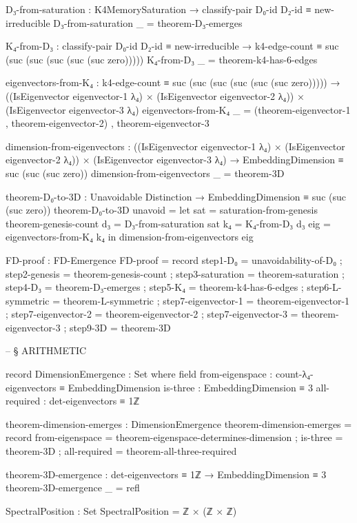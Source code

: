 \documentclass[11pt,a4paper]{book}
\begin{document}
\begin{code}
D₃-from-saturation : K4MemorySaturation → classify-pair D₀-id D₂-id ≡ new-irreducible
D₃-from-saturation _ = theorem-D₃-emerges

K₄-from-D₃ : classify-pair D₀-id D₂-id ≡ new-irreducible → 
             k4-edge-count ≡ suc (suc (suc (suc (suc (suc zero)))))
K₄-from-D₃ _ = theorem-k4-has-6-edges

eigenvectors-from-K₄ : k4-edge-count ≡ suc (suc (suc (suc (suc (suc zero))))) →
  ((IsEigenvector eigenvector-1 λ₄) × (IsEigenvector eigenvector-2 λ₄)) × 
  (IsEigenvector eigenvector-3 λ₄)
eigenvectors-from-K₄ _ = (theorem-eigenvector-1 , theorem-eigenvector-2) , theorem-eigenvector-3

dimension-from-eigenvectors : 
  ((IsEigenvector eigenvector-1 λ₄) × (IsEigenvector eigenvector-2 λ₄)) × 
  (IsEigenvector eigenvector-3 λ₄) → EmbeddingDimension ≡ suc (suc (suc zero))
dimension-from-eigenvectors _ = theorem-3D

theorem-D₀-to-3D : Unavoidable Distinction → EmbeddingDimension ≡ suc (suc (suc zero))
theorem-D₀-to-3D unavoid = 
  let sat = saturation-from-genesis theorem-genesis-count
      d₃  = D₃-from-saturation sat
      k₄  = K₄-from-D₃ d₃
      eig = eigenvectors-from-K₄ k₄
  in dimension-from-eigenvectors eig

FD-proof : FD-Emergence
FD-proof = record
  { step1-D₀          = unavoidability-of-D₀
  ; step2-genesis     = theorem-genesis-count
  ; step3-saturation  = theorem-saturation
  ; step4-D₃          = theorem-D₃-emerges
  ; step5-K₄          = theorem-k4-has-6-edges
  ; step6-L-symmetric = theorem-L-symmetric
  ; step7-eigenvector-1 = theorem-eigenvector-1
  ; step7-eigenvector-2 = theorem-eigenvector-2
  ; step7-eigenvector-3 = theorem-eigenvector-3
  ; step9-3D          = theorem-3D
  }


-- § ARITHMETIC

record DimensionEmergence : Set where
  field
    from-eigenspace : count-λ₄-eigenvectors ≡ EmbeddingDimension
    is-three        : EmbeddingDimension ≡ 3
    all-required    : det-eigenvectors ≡ 1ℤ

theorem-dimension-emerges : DimensionEmergence
theorem-dimension-emerges = record
  { from-eigenspace = theorem-eigenspace-determines-dimension
  ; is-three = theorem-3D
  ; all-required = theorem-all-three-required
  }

theorem-3D-emergence : det-eigenvectors ≡ 1ℤ → EmbeddingDimension ≡ 3
theorem-3D-emergence _ = refl

SpectralPosition : Set
SpectralPosition = ℤ × (ℤ × ℤ)


\end{code}
\end{document}
